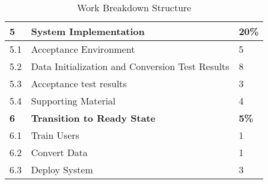 \begin{table}[h]
\begin{tabular}{|p{1cm}|p{10cm}|p{1cm}|}
\textbf{5} & \textbf{System Implementation} & \textbf{20\%} \\ \hline
5.1	& Acceptance Environment & 5 \\ 
5.2	& Data Initialization and Conversion Test Results & 8 \\ 
5.3	& Acceptance test results & 3 \\ 
5.4	& Supporting Material & 4 \\ \hline
\textbf{6} & \textbf{Transition to Ready State} & \textbf{5\%} \\ \hline
6.1	& Train Users & 1 \\ 
6.2	& Convert Data & 1 \\ 
6.3	& Deploy System & 3 \\ \hline
\end{tabular}
\caption{Work Breakdown Structure}
\label{tag:WBS}
\end{table}


